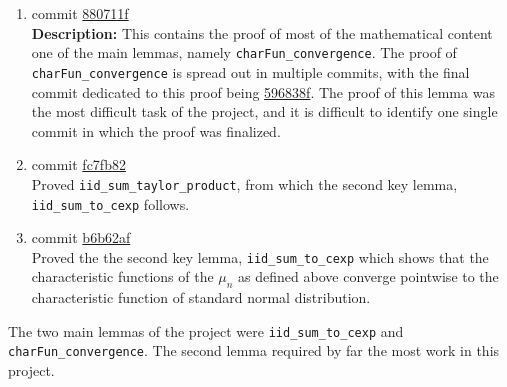 \documentclass[12pt]{article}
\begin{document}
\begin{enumerate}[label=\arabic*:, leftmargin=1cm]

    \item commit \href{https://github.com/ristoraveala/course_project/commit/880711fffb6b6ed5387d25e7a5b5876e41b2cb31}{880711f} \\
    \textbf{Description:}
    This contains the proof of most of the mathematical content one of the main lemmas, namely \lstinline{charFun_convergence}. The proof of \lstinline{charFun_convergence} is spread out in multiple commits, with the final commit dedicated to this proof being \href{https://github.com/ristoraveala/course_project/commit/596838fccb7eb732d234e8d88bad2c0218fa968c}{596838f}. The proof of this lemma was the most difficult task of the project, and it is difficult to identify one single commit in which the proof was finalized.

    
    \item commit \href{https://github.com/ristoraveala/course_project/commit/fc7fb82e8230f713eea08c8b9e075fd9af75da4c}{fc7fb82} \\ 
    Proved \lstinline{iid_sum_taylor_product}, from which the second key lemma, \lstinline{iid_sum_to_cexp} follows.

    \item commit \href{https://github.com/ristoraveala/course_project/commit/b6b62af2eea7d5f06709dfc11b21cb1c5c2c5514}{b6b62af} \\ 
    Proved the the second key lemma, \lstinline{iid_sum_to_cexp} which shows that the characteristic functions of the $\mu_n$ as defined above converge pointwise to the characteristic function of standard normal distribution.
    

    
\end{enumerate}

The two main lemmas of the project were \lstinline{iid_sum_to_cexp} and \lstinline{charFun_convergence}. The second lemma required by far the most work in this project.
\end{document}
